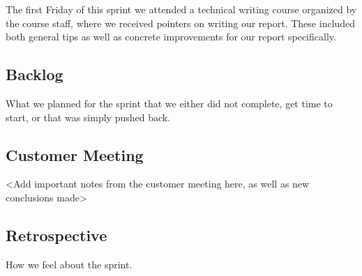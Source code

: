 The first Friday of this sprint we attended a technical writing course organized by the course staff, where we received pointers on writing our report. These included both general tips as well as concrete improvements for our report specifically.

\subsection{Backlog}
What we planned for the sprint that we either did not complete, get time to start, or that was simply pushed back.

\subsection{Customer Meeting}
<Add important notes from the customer meeting here, as well as new conclusions made>

\subsection{Retrospective}
How we feel about the sprint.